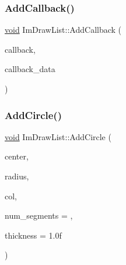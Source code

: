 \mbox{\label{structImDrawList_a14073d60ef9db9dc663dc7717a4893a5}} 
\subsubsection{\texorpdfstring{Add\+Callback()}{AddCallback()}}
{\footnotesize\ttfamily \hyperlink{imgui__impl__opengl3__loader_8h_ac668e7cffd9e2e9cfee428b9b2f34fa7}{void} Im\+Draw\+List\+::\+Add\+Callback (\begin{DoxyParamCaption}\item[{\hyperlink{imgui_8h_a232a477233f9e3ab7640720bf94674de}{Im\+Draw\+Callback}}]{callback,  }\item[{\hyperlink{imgui__impl__opengl3__loader_8h_ac668e7cffd9e2e9cfee428b9b2f34fa7}{void} $\ast$}]{callback\+\_\+data }\end{DoxyParamCaption})}

\mbox{\label{structImDrawList_a9b73eea0ebf7a9f02bc8a104deb7de9d}} 
\subsubsection{\texorpdfstring{Add\+Circle()}{AddCircle()}}
{\footnotesize\ttfamily \hyperlink{imgui__impl__opengl3__loader_8h_ac668e7cffd9e2e9cfee428b9b2f34fa7}{void} Im\+Draw\+List\+::\+Add\+Circle (\begin{DoxyParamCaption}\item[{const \hyperlink{structImVec2}{Im\+Vec2} \&}]{center,  }\item[{float}]{radius,  }\item[{Im\+U32}]{col,  }\item[{int}]{num\+\_\+segments = {},  }\item[{float}]{thickness = {\ttfamily 1.0f} }\end{DoxyParamCaption})}

\mbox{\label{structImDrawList_aef950cf8b0293b2c5e4708af72de045b}} 
